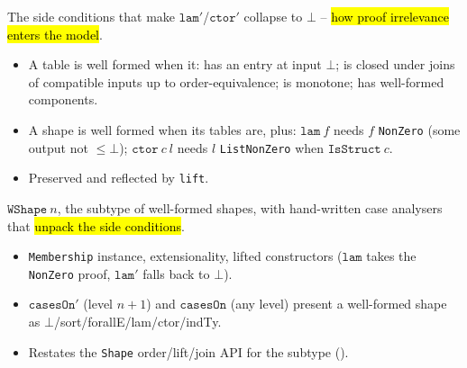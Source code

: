 \begin{definition}
\label{def:expa-shape-wf}
\leanok
{}
 The side conditions that make $\mathtt{lam}'$/$\mathtt{ctor}'$ collapse to $\bot$ --
\hl{how proof irrelevance enters the model}.
\begin{itemize}
\item A table is well formed when it: has an entry at input $\bot$; is closed under joins of
compatible inputs up to order-equivalence; is monotone; has well-formed components.
\item A shape is well formed when its tables are, plus: $\mathtt{lam}\ f$ needs $f$ \texttt{NonZero}
(some output not $\le\bot$); $\mathtt{ctor}\ c\ l$ needs $l$ \texttt{ListNonZero} when
$\mathtt{IsStruct}\ c$.
\item Preserved and reflected by \texttt{lift}.
\end{itemize}
\end{definition}

\begin{definition}
\label{def:expa-wshape}
\leanok
{}
 $\mathtt{WShape}\ n$, the subtype of well-formed shapes, with hand-written case
analysers that \hl{unpack the side conditions}.
\begin{itemize}
\item \texttt{Membership} instance, extensionality, lifted constructors ($\mathtt{lam}$ takes the
\texttt{NonZero} proof, $\mathtt{lam}'$ falls back to $\bot$).
\item $\mathtt{casesOn}'$ (level $n{+}1$) and $\mathtt{casesOn}$ (any level) present a well-formed
shape as $\bot$/sort/forallE/lam/ctor/indTy.
\item Restates the \texttt{Shape} order/lift/join API for the subtype
().
\end{itemize}
\end{definition}

